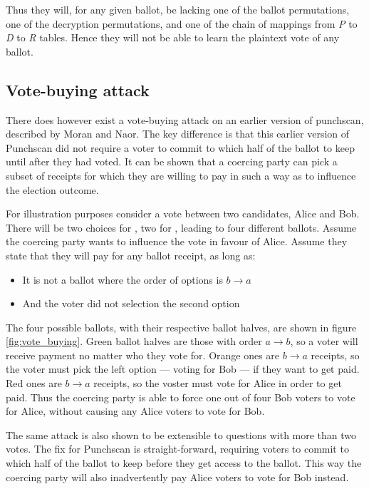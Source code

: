 Thus they will, for any given ballot, be lacking one of the ballot
permutations, one of the decryption permutations, and one of the chain of
mappings from \emph{P} to \emph{D} to \emph{R} tables. Hence they will not be
able to learn the plaintext vote of any ballot.

\subsection{Vote-buying attack}

There does however exist a vote-buying attack on an earlier version of
punchscan, described by Moran and
Naor\autocite{moranSplitballotVotingEverlasting2010}. The key difference is
that this earlier version of Punchscan did not require a voter to commit to
which half of the ballot to keep until after they had voted. It can be shown
that a coercing party can pick a subset of receipts for which they are willing
to pay in such a way as to influence the election outcome.

For illustration purposes consider a vote between two candidates, Alice and
Bob. There will be two choices for \ptop{}, two for \pbottom{}, leading to four
different ballots. Assume the coercing party wants to influence the vote in
favour of Alice. Assume they state that they will pay for any ballot receipt,
as long as:
\begin{itemize}
\item It is not a ballot where the order of options is $b \rightarrow a$
\item And the voter did not selection the second option
\end{itemize}

The four possible ballots, with their respective ballot halves, are shown in
figure \ref{fig:vote_buying}. Green ballot halves are those with order $a
\rightarrow b$, so a voter will receive payment no matter who they vote for.
Orange ones are $b \rightarrow a$ receipts, so the voter must pick the left
option --- voting for Bob --- if they want to get paid. Red ones are $b
\rightarrow a$ receipts, so the voster must vote for Alice in order to get paid.
Thus the coercing party is able to force one out of four Bob voters to vote for
Alice, without causing any Alice voters to vote for Bob.

The same attack is also shown to be extensible to questions with more than two
votes. The fix for Punchscan is straight-forward, requiring voters to commit to
which half of the ballot to keep before they get access to the ballot. This way
the coercing party will also inadvertently pay Alice voters to vote for Bob
instead.

